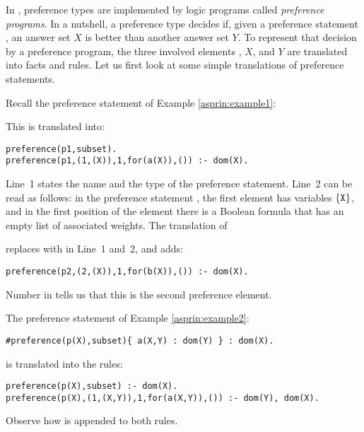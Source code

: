 In \asprin, preference types are implemented by logic programs called \emph{preference programs}.
In a nutshell, a preference type decides if, 
given a preference statement , 
an answer set $X$ is better than another answer set $Y$.
To represent that decision by a preference program, 
the three involved elements , $X$, and $Y$ are translated into facts and rules.
Let us first look at some simple translations of preference statements.
\begin{example}
\label{asprin:example1translated}
Recall the preference statement  of Example \ref{asprin:example1}:

This is translated into: %
\begin{lstlisting}
preference(p1,subset).
preference(p1,(1,(X)),1,for(a(X)),()) :- dom(X).
\end{lstlisting}
Line~1 states the name and the type of the preference statement.
Line~2 can be read as follows:
in the preference statement , the first element has variables $\{\texttt{X}\}$,  
and in the first position of the element there is a Boolean formula  that has an empty list of associated weights.
The translation of 

replaces  with  in Line~1 and~2, and adds:
\begin{lstlisting}[numbers=none]
preference(p2,(2,(X)),1,for(b(X)),()) :- dom(X).
\end{lstlisting}
Number  in  tells us that this is the second preference element. 
\end{example}

\begin{example}
The preference statement of Example \ref{asprin:example2}: 
\begin{lstlisting}[numbers=none]
#preference(p(X),subset){ a(X,Y) : dom(Y) } : dom(X).
\end{lstlisting}
is translated into the rules:
\begin{lstlisting}[numbers=none]
preference(p(X),subset) :- dom(X).
preference(p(X),(1,(X,Y)),1,for(a(X,Y)),()) :- dom(Y), dom(X).
\end{lstlisting}
Observe how  is appended to both rules. 
\end{example}

